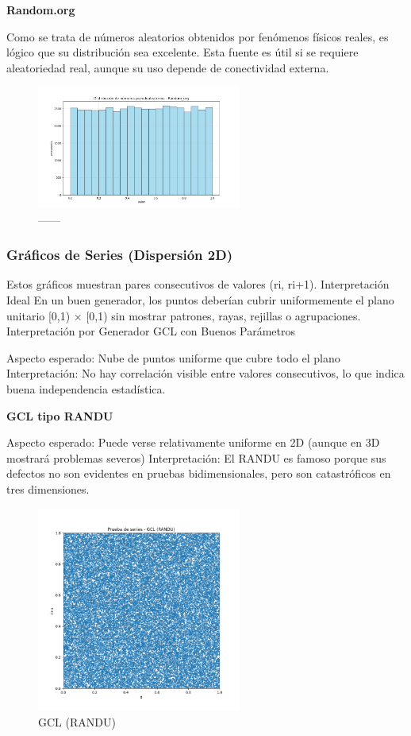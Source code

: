 \documentclass{article}
\begin{document}
\textbf{Random.org}

Como se trata de números aleatorios obtenidos por fenómenos físicos reales, es lógico que su distribución sea excelente. Esta fuente es útil si se requiere aleatoriedad real, aunque su uso depende de conectividad externa.

\begin{figure}[H]
\centering
\includegraphics[width=0.6\textwidth]{Imagenes/distribucion_Random_org.png}
\caption{------}
\end{figure}

\subsubsection{Gráficos de Series (Dispersión 2D)}
Estos gráficos muestran pares consecutivos de valores (ri, ri+1).
Interpretación Ideal
En un buen generador, los puntos deberían cubrir uniformemente el plano unitario [0,1) × [0,1) sin mostrar patrones, rayas, rejillas o agrupaciones.
Interpretación por Generador
GCL con Buenos Parámetros

Aspecto esperado: Nube de puntos uniforme que cubre todo el plano
Interpretación: No hay correlación visible entre valores consecutivos, lo que indica buena independencia estadística.

\textbf{GCL tipo RANDU}

Aspecto esperado: Puede verse relativamente uniforme en 2D (aunque en 3D mostrará problemas severos)
Interpretación: El RANDU es famoso porque sus defectos no son evidentes en pruebas bidimensionales, pero son catastróficos en tres dimensiones.
\begin{figure}[H]
\centering
\includegraphics[width=0.6\textwidth]{Imagenes/series_GCL (RANDU).png}
\caption{GCL (RANDU)}
\end{figure}
\end{document}
